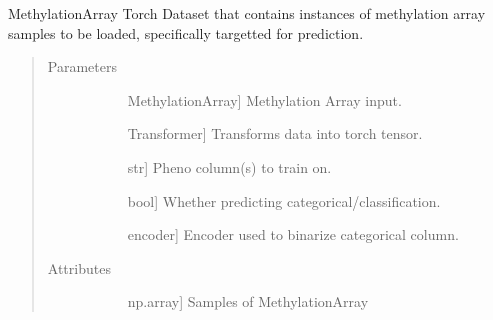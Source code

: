 \documentclass[letterpaper,10pt,english]{sphinxmanual}
\begin{document}
\begin{fulllineitems}
\begin{fulllineitems}
\begin{quote}
\begin{description}
\end{description}\end{quote}

\end{fulllineitems}


\end{fulllineitems}


\begin{fulllineitems}
\label{\detokenize{index:methylnet.datasets.MethylationGenerationDataSet}}
MethylationArray Torch Dataset that contains instances of methylation array samples to be loaded, specifically targetted for prediction.
\begin{quote}\begin{description}
\item[{Parameters}] \leavevmode\begin{description}
\item[{}] \leavevmode{[}MethylationArray{]}
Methylation Array input.

\item[{}] \leavevmode{[}Transformer{]}
Transforms data into torch tensor.

\item[{}] \leavevmode{[}str{]}
Pheno column(s) to train on.

\item[{}] \leavevmode{[}bool{]}
Whether predicting categorical/classification.

\item[{}] \leavevmode{[}encoder{]}
Encoder used to binarize categorical column.

\end{description}

\item[{Attributes}] \leavevmode\begin{description}
\item[{}] \leavevmode{[}np.array{]}
Samples of MethylationArray


\end{description}
\end{description}
\end{quote}
\end{fulllineitems}
\end{document}
